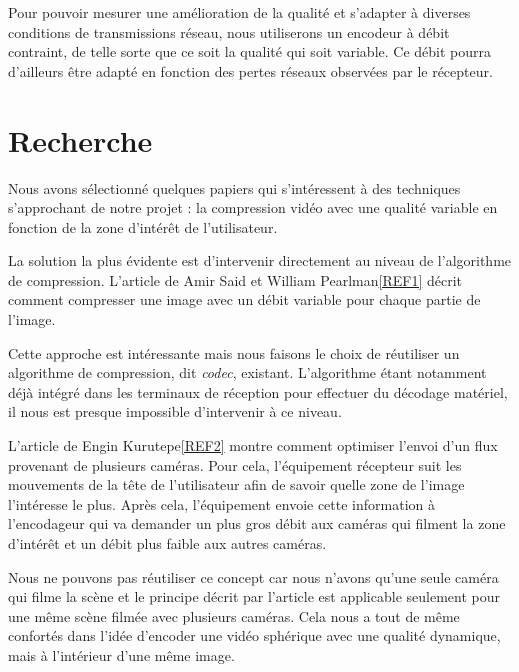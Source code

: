 \documentclass[11pt,a4paper]{article}
\begin{document}
\bigbreak
Pour pouvoir mesurer une amélioration de la qualité et s’adapter à diverses conditions de transmissions réseau, nous utiliserons un encodeur à débit contraint, de telle sorte que ce soit la qualité qui soit variable.
Ce débit pourra d’ailleurs être adapté en fonction des pertes réseaux observées par le récepteur.


\section{Recherche}

Nous avons sélectionné quelques papiers qui s'intéressent à des techniques s'approchant de notre projet : la compression vidéo avec une qualité variable en fonction de la zone d'intérêt de l'utilisateur.

\bigbreak
La solution la plus évidente est d'intervenir directement au niveau de l'algorithme de compression.
L'article de Amir Said et William Pearlman\ref{REF1} décrit comment compresser une image avec un débit variable pour chaque partie de l'image.

Cette approche est intéressante mais nous faisons le choix de réutiliser un algorithme de compression, dit \textit{codec}, existant.
L'algorithme étant notamment déjà intégré dans les terminaux de réception pour effectuer du décodage matériel, il nous est presque impossible d'intervenir à ce niveau.

\bigbreak
L'article de Engin Kurutepe\ref{REF2} montre comment optimiser l'envoi d'un flux provenant de plusieurs caméras.
Pour cela, l'équipement récepteur suit les mouvements de la tête de l'utilisateur afin de savoir quelle zone de l'image l'intéresse le plus.
Après cela, l'équipement envoie cette information à l'encodageur qui va demander un plus gros débit aux caméras qui filment la zone d'intérêt et un débit plus faible aux autres caméras.

Nous ne pouvons pas réutiliser ce concept car nous n'avons qu'une seule caméra qui filme la scène et le principe décrit par l'article est applicable seulement pour une même scène filmée avec plusieurs caméras.
Cela nous a tout de même confortés dans l'idée d'encoder une vidéo sphérique avec une qualité dynamique, mais à l'intérieur d'une même image.
\end{document}
